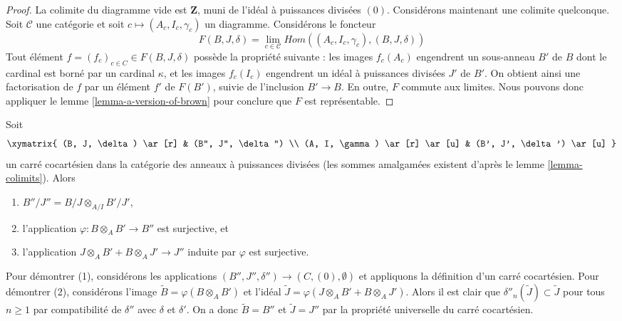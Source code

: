\begin{proof} La
colimite du diagramme vide est $\mathbf{Z}$, muni de l'idéal à puissances divisées $(0)$.
Considérons maintenant une colimite quelconque. Soit $\mathcal{C}$ une catégorie et soit
$c \mapsto (A_c, I_c, \gamma_c)$ un diagramme. Considérons le foncteur
$$
F(B, J, \delta) = \lim_{c \in\mathcal{C}}
Hom((A_c, I_c, \gamma_c), (B, J, \delta))
$$
Tout élément $f = (f_c)_{c \in C} \in F(B, J, \delta)$ possède la
propriété suivante : les images $f_c(A_c)$ engendrent un sous-anneau $B'$ de $B$ dont le cardinal est
borné par un cardinal $\kappa$, et les images $f_c(I_c)$ engendrent
un idéal à puissances divisées $J'$ de $B'$. On obtient ainsi une factorisation de
$f$ par un élément $f'$ de $F(B')$, suivie de l'inclusion $B' \to B$. En outre,
$F$ commute aux limites. Nous pouvons donc appliquer
le lemme \ref{lemma-a-version-of-brown}
pour conclure que $F$ est représentable.
\end{proof}

\begin{remark}
\label{remark-pushout}
Soit
$$
\xymatrix{
(B, J, \delta) \ar[r] & (B'', J'', \delta'') \\
(A, I, \gamma) \ar[r] \ar[u] & (B', J', \delta') \ar[u]
}
$$
un carré cocartésien dans la catégorie des anneaux à puissances divisées (les sommes amalgamées existent
d'après le lemme \ref{lemma-colimits}). Alors
\begin{enumerate}
\item $B''/J'' = B/J \otimes_{A/I} B'/J'$,
\item l'application $\varphi : B \otimes_A B' \to B''$ est surjective, et
\item l'application $J \otimes_A B' + B \otimes_A J' \to J''$ induite par $\varphi$
est surjective.
\end{enumerate} Pour
démontrer (1), considérons les applications $(B'', J'', \delta'') \to (C, (0), \emptyset)$
et appliquons la définition d'un carré cocartésien. Pour démontrer (2), considérons
l'image $\tilde B = \varphi(B \otimes_A B')$ et l'idéal
$\tilde J = \varphi(J \otimes_A B' + B \otimes_A J')$. Alors il
est clair que $\delta''_n(\tilde J) \subset\tilde J$ pour tous $n \geq 1$
par compatibilité de $\delta''$ avec $\delta$ et $\delta'$.
On a donc $\tilde B = B''$ et $\tilde J = J''$
par la propriété universelle du carré cocartésien.
\end{remark}

